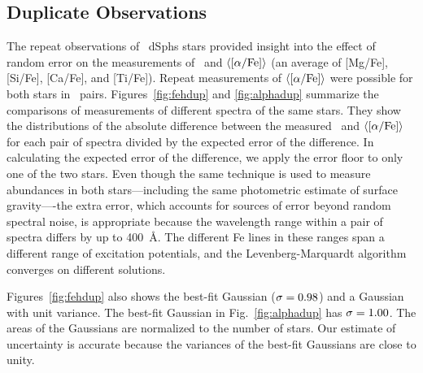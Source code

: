 \documentclass{emulateapj}
\begin{document}
\subsection{Duplicate Observations}
\label{sec:duplicate}

The repeat observations of \ndup\ dSphs stars provided insight into
the effect of random error on the measurements of \feh\ and
$\langle[\alpha/\rm{Fe}]\rangle$ (an average of [Mg/Fe], [Si/Fe],
[Ca/Fe], and [Ti/Fe]).  Repeat measurements of
$\langle[\alpha/\rm{Fe}]\rangle$ were possible for both stars in
\nalphadup\ pairs.  Figures~\ref{fig:fehdup} and \ref{fig:alphadup}
summarize the comparisons of measurements of different spectra of the
same stars.  They show the distributions of the absolute difference
between the measured \feh\ and $\langle[\alpha/\rm{Fe}]\rangle$ for
each pair of spectra divided by the expected error of the difference.
In calculating the expected error of the difference, we apply the
error floor to only one of the two stars.  Even though the same
technique is used to measure abundances in both stars---including the
same photometric estimate of surface gravity----the extra error, which
accounts for sources of error beyond random spectral noise, is
appropriate because the wavelength range within a pair of spectra
differs by up to 400~\AA.  The different Fe lines in these ranges span
a different range of excitation potentials, and the
Levenberg-Marquardt algorithm converges on different solutions.

Figures~\ref{fig:fehdup} also shows the best-fit Gaussian ($\sigma =
0.98$) and a Gaussian with unit variance.  The best-fit
Gaussian in Fig.~\ref{fig:alphadup} has $\sigma = 1.00$.
The areas of the Gaussians are normalized to the number of stars.  Our
estimate of uncertainty is accurate because the variances of the
best-fit Gaussians are close to unity.

\end{document}
